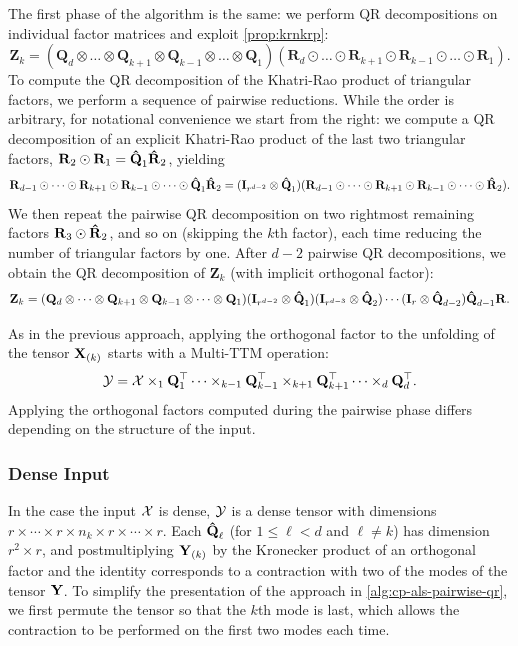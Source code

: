 \documentclass{article}
\newcommand{\mat}[1]{\mathbf{#1}}
\newcommand{\M}[2][]{\bm{#1{\mathbf{\MakeUppercase{#2}}}}} 		%
\newcommand{\T}[2][]{#1{\mathbf{\cal{#2}}}} 						%
\newcommand{\kron}{\otimes}
\begin{document}
The first phase of the algorithm is the same: we perform QR decompositions on individual factor matrices and exploit \cref{prop:krnkrp}:
$$\mat{Z}_k = (\mat{Q}_d \otimes \dots \otimes \mat{Q}_{k+1} \otimes \mat{Q}_{k-1} \otimes \dots \otimes \mat{Q}_1)(\mat{R}_d \odot \dots \odot \mat{R}_{k+1} \odot \mat{R}_{k-1} \odot \dots \odot \mat{R}_1).$$
To compute the QR decomposition of the Khatri-Rao product of triangular factors, we perform a sequence of pairwise reductions.
While the order is arbitrary, for notational convenience we start from the right: we compute a QR decomposition of an explicit Khatri-Rao product of the last two triangular factors, $\mat{R}_2 \odot \mat{R}_1 = \M[\hat]{Q}_1\M[\hat]{R}_2$, yielding
$$\M{R}_{d-1} \odot \dots \odot \mat{R}_{k+1} \odot \mat{R}_{k-1} \odot \dots \odot \M[\hat]{Q}_1\M[\hat]{R}_2 = (\M{I}_{r^{d-2}} \kron \M[\hat]{Q}_1)(\M{R}_{d-1} \odot \cdots \odot \mat{R}_{k+1} \odot \mat{R}_{k-1} \odot \dots \odot \M[\hat]{R}_2).$$
We then repeat the pairwise QR decomposition on two rightmost remaining factors $\M{R}_{3} \odot \M[\hat]{R}_2$, and so on (skipping the $k$th factor), each time reducing the number of triangular factors by one.
After $d-2$ pairwise QR decompositions, we obtain the QR decomposition of $\mat{Z}_k$ (with implicit orthogonal factor):
$$\mat{Z}_k = (\mat{Q}_d \otimes \dots \otimes \mat{Q}_{k+1} \otimes \mat{Q}_{k-1} \otimes \dots \otimes \mat{Q}_1) (\M{I}_{r^{d-2}} \kron \M[\hat]{Q}_1)(\M{I}_{r^{d-3}} \kron \M[\hat]{Q}_2) \cdots (\mat{I}_r \otimes \M[\hat]{Q}_{d-2}) \M[\hat]{Q}_{d-1}\M{R}.$$

As in the previous approach, applying the orthogonal factor to the unfolding of the tensor $\M{X}_{(k)}$ starts with a Multi-TTM operation:
$$\T{Y} =  \T{X} \times_1 \mat{Q}_1^\top \dots \times_{k-1} \mat{Q}_{k-1}^\top \times_{k+1} \mat{Q}_{k+1}^\top \dots \times_d \mat{Q}_d^\top.$$
Applying the orthogonal factors computed during the pairwise phase differs depending on the structure of the input.

\subsubsection{Dense Input}

In the case the input $\T{X}$ is dense, $\T{Y}$ is a dense tensor with dimensions $r\times \cdots \times r \times n_k \times r \times \cdots \times r$.
Each $\M[\hat]{Q}_\ell$ (for $1\leq \ell < d$ and $\ell \neq k$) has dimension $r^2 \times r$, and postmultiplying $\M{Y}_{(k)}$ by the Kronecker product of an orthogonal factor and the identity corresponds to a contraction with two of the modes of the tensor $\M{Y}$.
To simplify the presentation of the approach in \cref{alg:cp-als-pairwise-qr}, we first permute the tensor so that the $k$th mode is last, which allows the contraction to be performed on the first two modes each time.
 
\end{document}
